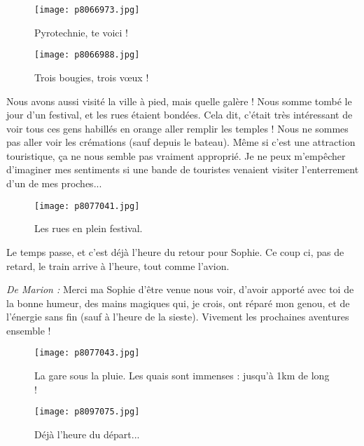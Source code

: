 \documentclass{book}
\begin{document}
\begin{figure}[h]
\centering
\texttt{[image: p8066973.jpg]}
\caption*{Pyrotechnie, te voici !}
\end{figure}


\begin{figure}[h]
\centering
\texttt{[image: p8066988.jpg]}
\caption*{Trois bougies, trois vœux !}
\end{figure}

Nous avons aussi visité la ville à pied, mais quelle galère ! Nous somme tombé le jour d'un festival, et les rues étaient bondées. Cela dit, c'était très intéressant de voir tous ces gens habillés en orange aller remplir les temples ! Nous ne sommes pas aller voir les crémations (sauf depuis le bateau). Même si c'est une attraction touristique, ça ne nous semble pas vraiment approprié. Je ne peux m'empêcher d'imaginer mes sentiments si une bande de touristes venaient visiter l'enterrement d'un de mes proches...


\begin{figure}[h]
\centering
\texttt{[image: p8077041.jpg]}
\caption*{Les rues en plein festival.}
\end{figure}

Le temps passe, et c'est déjà l'heure du retour pour Sophie. Ce coup ci, pas de retard, le train arrive à l'heure, tout comme l'avion.

\emph{De Marion :} Merci ma Sophie d'être venue nous voir, d'avoir apporté avec toi de la bonne humeur, des mains magiques qui, je crois, ont réparé mon genou, et de l'énergie sans fin (sauf à l'heure de la sieste). Vivement les prochaines aventures ensemble !


\begin{figure}[h]
\centering
\texttt{[image: p8077043.jpg]}
\caption*{La gare sous la pluie. Les quais sont immenses : jusqu'à 1km de long !}
\end{figure}


\begin{figure}[h]
\centering
\texttt{[image: p8097075.jpg]}
\caption*{Déjà l'heure du départ...}
\end{figure}




\tableofcontents
\end{document}
